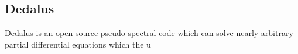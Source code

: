 {\color{purple}    
\subsection{Dedalus}}

Dedalus is an open-source pseudo-spectral code which can solve nearly arbitrary partial differential equations which the u 
